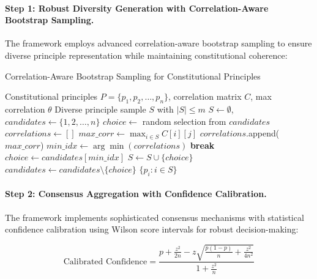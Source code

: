 \documentclass[manuscript,screen,9pt]{acmart}
\begin{document}
\paragraph{Step 1: Robust Diversity Generation with Correlation-Aware Bootstrap Sampling.}
The framework employs advanced correlation-aware bootstrap sampling to ensure diverse principle representation while maintaining constitutional coherence:

\begin{algorithm}[!htb]
\caption{Correlation-Aware Bootstrap Sampling for Constitutional Principles}
\label{alg:correlation_bootstrap}
\begin{algorithmic}[1]
\Require Constitutional principles $P = \{p_1, p_2, \ldots, p_n\}$, correlation matrix $C$, max correlation $\theta$
\Ensure Diverse principle sample $S$ with $|S| \leq m$
\State $S \leftarrow \emptyset$, $candidates \leftarrow \{1, 2, \ldots, n\}$
        \State $choice \leftarrow$ random selection from $candidates$
    \Else
        \State $correlations \leftarrow []$
            \State $max\_corr \leftarrow \max_{i \in S} C[i][j]$
            \State $correlations$.append($max\_corr$)
        \EndFor
        \State $min\_idx \leftarrow \arg\min(correlations)$
            \State \textbf{break} 
        \EndIf
        \State $choice \leftarrow candidates[min\_idx]$
    \EndIf
    \State $S \leftarrow S \cup \{choice\}$
    \State $candidates \leftarrow candidates \setminus \{choice\}$
\EndWhile
\State \Return $\{p_i : i \in S\}$
\end{algorithmic}
\end{algorithm}

\paragraph{Step 2: Consensus Aggregation with Confidence Calibration.}
The framework implements sophisticated consensus mechanisms with statistical confidence calibration using Wilson score intervals for robust decision-making:

\begin{equation}
\text{Calibrated Confidence} = \frac{p + \frac{z^2}{2n} - z\sqrt{\frac{p(1-p)}{n} + \frac{z^2}{4n^2}}}{1 + \frac{z^2}{n}}
\end{equation}
\end{document}
